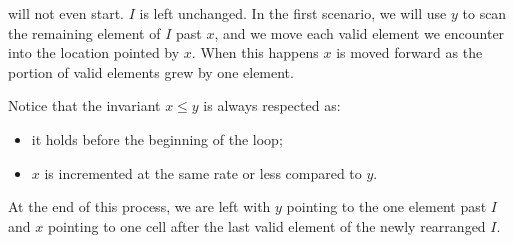 will not even start. $I$ is left unchanged.
In the first scenario, we will use $y$ to scan the remaining element of $I$ past $x$, and we move each valid element we encounter 
into the location pointed by $x$. When this happens $x$ is moved forward as the portion of valid elements grew by one element. 

Notice that the invariant $x \leq y$ is always respected as:
\begin{itemize}
	\item it holds before the beginning of the loop;
	\item $x$ is incremented at the same rate or less compared to $y$.
\end{itemize}

At the end of this process, we are left with $y$ pointing to the one element past $I$ and $x$ pointing to one cell after the last valid element of the newly rearranged $I$.

